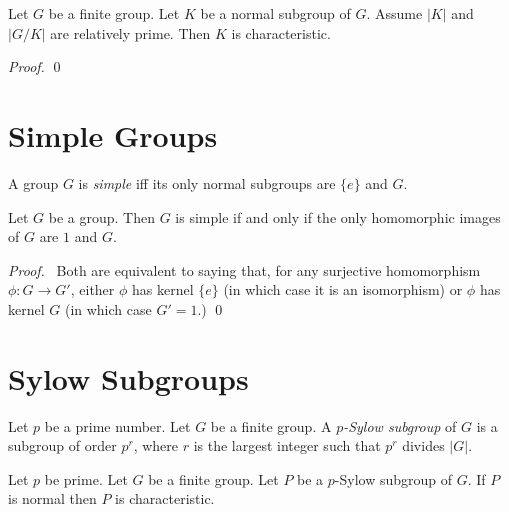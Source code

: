 \begin{prop}
\label{prop:K-GK-relatively-prime-K-characteristic}
Let $G$ be a finite group. Let $K$ be a normal subgroup of $G$. Assume $|K|$ and $|G/K|$ are relatively prime. Then $K$ is characteristic.
\end{prop}

\begin{proof}
\pf
{}
\qed
\end{proof}

\section{Simple Groups}

\begin{df}
A group $G$ is \emph{simple} iff its only normal subgroups are $\{e\}$ and $G$.
\end{df}

\begin{prop}
Let $G$ be a group. Then $G$ is simple if and only if the only homomorphic images of $G$ are $1$ and $G$.
\end{prop}

\begin{proof}
\pf\ Both are equivalent to saying that, for any surjective homomorphism $\phi : G \rightarrow G'$, either $\phi$ has kernel $\{e\}$ (in which case it is an isomorphism) or $\phi$ has kernel $G$ (in which case $G' = 1$.) \qed
\end{proof}

\section{Sylow Subgroups}

\begin{df}
Let $p$ be a prime number. Let $G$ be a finite group. A \emph{$p$-Sylow subgroup} of $G$ is a subgroup of order $p^r$, where $r$ is the largest integer such that $p^r$ divides $|G|$.
\end{df}

\begin{prop}
Let $p$ be prime. Let $G$ be a finite group. Let $P$ be a $p$-Sylow subgroup of $G$. If $P$ is normal then $P$ is characteristic.
\end{prop}


